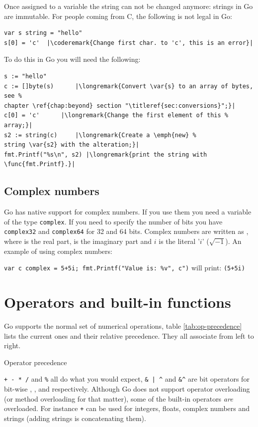 Once assigned to a variable the string can not be changed anymore: strings in Go are
immutable. For
people coming from C, the following is not legal in Go:
\begin{lstlisting}
var s string = "hello"
s[0] = 'c'  |\coderemark{Change first char. to 'c', this is an error}|
\end{lstlisting}
To do this in Go you will need the following:
\begin{lstlisting}
s := "hello"
c := []byte(s)	    |\longremark{Convert \var{s} to an array of bytes, see %
chapter \ref{chap:beyond} section "\titleref{sec:conversions}";}|
c[0] = 'c'	    |\longremark{Change the first element of this %
array;}|
s2 := string(c)     |\longremark{Create a \emph{new} %
string \var{s2} with the alteration;}|
fmt.Printf("%s\n", s2) |\longremark{print the string with \func{fmt.Printf}.}|
\end{lstlisting}

\showremarks
\subsection{Complex numbers}
Go has native support for complex numbers. If you 
use them you need a variable of the type \lstinline{complex}. If
you need to specify the number of bits you have \lstinline{complex32} and
\lstinline{complex64} for 32 and 64 bits. Complex numbers are written as
, where  is the real part,
 is the imaginary part and $i$ is the literal '$i$' ($\sqrt{-1}$).
An example of using complex numbers:

\lstinline{var c complex = 5+5i; fmt.Printf("Value is: %v", c")}\newline
will print: \lstinline{(5+5i)}

\section{Operators and built-in functions}
Go supports the normal set of numerical operations,
table \ref{tab:op-precedence}
lists the current ones and their relative precedence. They
all associate from left to right.

\begin{table}[H]
\begin{center}
\caption{Operator precedence}
\label{tab:op-precedence}

\end{center}
\end{table}
\verb|+ - * /| and \verb|%| all do what you would expect,
\verb!& | ^!
and \verb!&^! are bit operators for bit-wise , 
,  and
 respectively.
Although Go does not support operator overloading (or method
overloading for that matter), some of the built-in
operators \emph{are} overloaded. For instance \texttt{+} can be used for integers,
floats, complex numbers and strings (adding strings is concatenating
them).

